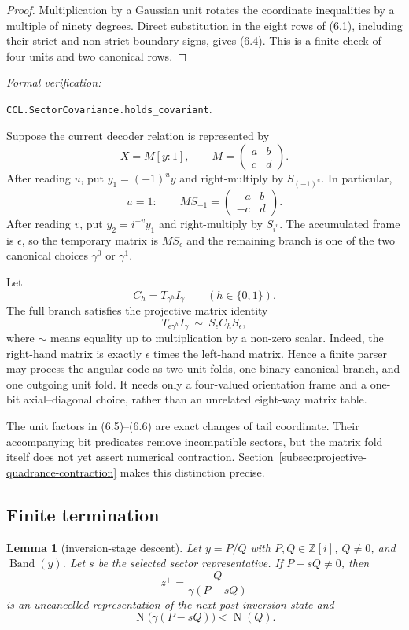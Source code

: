 \documentclass[10pt]{article}
\newtheorem{lemma}[theorem]{Lemma}
\theoremstyle{definition}
\theoremstyle{remark}
\newcommand{\Zi}{\mathbb{Z}[i]}
\newcommand{\Norm}{\operatorname{N}}
\newcommand{\bits}{\{0,1\}}
\newcommand{\leanref}[1]{\par\smallskip\noindent
  \emph{Formal verification:}\par\nobreak
  {\raggedright\nolinkurl{#1}.\par}}
\newcommand{\Proj}[2]{[#1:#2]}
\newcommand{\mat}[4]{\begin{pmatrix}#1&#2\\#3&#4\end{pmatrix}}
\begin{document}
\begin{proof}
Multiplication by a Gaussian unit rotates the coordinate inequalities by a multiple of ninety degrees.  Direct substitution in the eight rows of (6.1), including their strict and non-strict boundary signs, gives (6.4).  This is a finite check of four units and two canonical rows.
\end{proof}

\leanref{CCL.SectorCovariance.holds_covariant}

Suppose the current decoder relation is represented by
\[
 X=M\Proj{y}{1},\qquad M=\mat{a}{b}{c}{d}.
\]
After reading $u$, put $y_1=(-1)^uy$ and right-multiply by $S_{(-1)^u}$.  In particular,
\[
 u=1:
 \qquad
 MS_{-1}=\mat{-a}{b}{-c}{d}.
\tag{6.5}
\]
After reading $v$, put $y_2=i^{-v}y_1$ and right-multiply by $S_{i^v}$.  The accumulated frame is $\epsilon$, so the temporary matrix is $MS_\epsilon$ and the remaining branch is one of the two canonical choices $\gamma^0$ or $\gamma^1$.

Let
\[
 C_h=T_{\gamma^h}I_\gamma\qquad(h\in\bits).
\]
The full branch satisfies the projective matrix identity
\[
 T_{\epsilon\gamma^h}I_\gamma
 \ \sim\ 
 S_\epsilon C_hS_\epsilon,
\tag{6.6}
\]
where $\sim$ means equality up to multiplication by a non-zero scalar.  Indeed, the right-hand matrix is exactly $\epsilon$ times the left-hand matrix.  Hence a finite parser may process the angular code as two unit folds, one binary canonical branch, and one outgoing unit fold.  It needs only a four-valued orientation frame and a one-bit axial--diagonal choice, rather than an unrelated eight-way matrix table.

The unit factors in (6.5)--(6.6) are exact changes of tail coordinate.  Their accompanying bit predicates remove incompatible sectors, but the matrix fold itself does not yet assert numerical contraction.  Section~\ref{subsec:projective-quadrance-contraction} makes this distinction precise.

\subsection{Finite termination}

\begin{lemma}[inversion-stage descent]\label{lem:ccl-inversion-descent}
Let $y=P/Q$ with $P,Q\in\Zi$, $Q\ne0$, and $\operatorname{Band}(y)$.  Let $s$ be the selected sector representative.  If $P-sQ\ne0$, then
\[
 z^+=\frac{Q}{\gamma(P-sQ)}
\]
is an uncancelled representation of the next post-inversion state and
\[
 \Norm\bigl(\gamma(P-sQ)\bigr)<\Norm(Q).
\]
\end{lemma}
\end{document}
